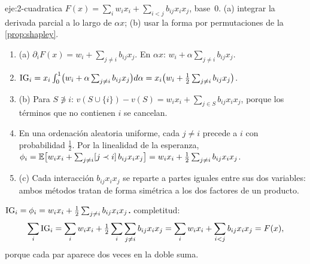\begin{solucion}{eje:2-cuadratica}
\datos $F(x)=\sum_iw_ix_i+\sum_{i<j}b_{ij}x_ix_j$, base~0.
\planteamiento (a) integrar la derivada parcial a lo largo de $\alpha x$; (b) usar la forma por permutaciones de la \cref{prop:shapley}.
\pasos
\begin{enumerate}[label=\arabic*.]
  \item (a) $\partial_iF(x)=w_i+\sum_{j\neq i}b_{ij}x_j$. En $\alpha x$: $w_i+\alpha\sum_{j\neq i}b_{ij}x_j$.
  \item $\operatorname{IG}_i=x_i\int_0^1\bigl(w_i+\alpha\sum_{j\neq i}b_{ij}x_j\bigr)d\alpha=x_i\bigl(w_i+\tfrac12\sum_{j\neq i}b_{ij}x_j\bigr)$.
  \item (b) Para $S\not\ni i$: $v(S\cup\{i\})-v(S)=w_ix_i+\sum_{j\in S}b_{ij}x_ix_j$, porque los términos que no contienen $i$ se cancelan.
  \item En una ordenación aleatoria uniforme, cada $j\neq i$ precede a $i$ con probabilidad $\tfrac12$. Por la linealidad de la esperanza, $\phi_i=\mathbb{E}\bigl[w_ix_i+\sum_{j\neq i}[j\prec i]\,b_{ij}x_ix_j\bigr]=w_ix_i+\tfrac12\sum_{j\neq i}b_{ij}x_ix_j$.
  \item (c) Cada interacción $b_{ij}x_ix_j$ se reparte a partes iguales entre sus dos variables: ambos métodos tratan de forma simétrica a los dos factores de un producto.
\end{enumerate}
\resultado \textbf{$\operatorname{IG}_i=\phi_i=w_ix_i+\tfrac12\sum_{j\neq i}b_{ij}x_ix_j$.}
\comprobacion completitud:
\[
\sum_i\operatorname{IG}_i=\sum_iw_ix_i+\tfrac12\sum_i\sum_{j\neq i}b_{ij}x_ix_j=\sum_iw_ix_i+\sum_{i<j}b_{ij}x_ix_j=F(x),
\]
porque cada par aparece dos veces en la doble suma.
\end{solucion}

